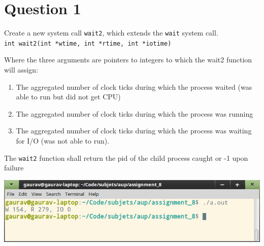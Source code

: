 \documentclass[main.tex]{subfiles}
\begin{document}
\section{Question 1}
Create a new system call \texttt{wait2}, which extends the \texttt{wait} system call.
\\
\texttt{int wait2(int *wtime, int *rtime, int *iotime)}

Where the three arguments are pointers to integers to which the wait2 function will assign:
\begin{enumerate}
  \item The aggregated number of clock ticks during which the process waited
    (was able to run but did not get CPU)
  \item The aggregated number of clock ticks during which the process was
    running
  \item The aggregated number of clock ticks during which the process was
    waiting for I/O (was not able to run).
\end{enumerate}
The \texttt{wait2} function shall return the pid of the child process caught or -1 upon failure


\includegraphics[width=\textwidth]{figures/1_output.png}
\end{document}
